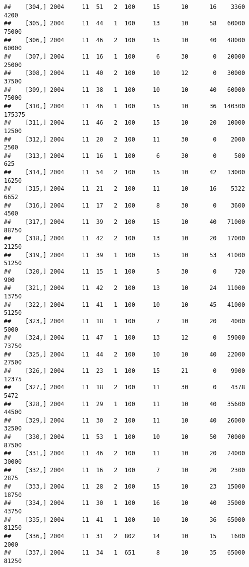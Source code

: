 \documentclass{article}\usepackage[]{graphicx}\usepackage[]{color}
\makeatletter
\newenvironment{kframe}{%
 \def\at@end@of@kframe{}%
 \ifinner\ifhmode%
  \def\at@end@of@kframe{\end{minipage}}%
  \begin{minipage}{\columnwidth}%
 \fi\fi%
 \def\FrameCommand##1{\hskip\@totalleftmargin \hskip-\fboxsep
 \colorbox{shadecolor}{##1}\hskip-\fboxsep
     \hskip-\linewidth \hskip-\@totalleftmargin \hskip\columnwidth}%
 \MakeFramed {\advance\hsize-\width
   \@totalleftmargin\z@ \linewidth\hsize
   \@setminipage}}%
 {\par\unskip\endMakeFramed%
 \at@end@of@kframe}
\newenvironment{knitrout}{}{} %
\makeatother
\begin{document}
\begin{knitrout}
\begin{kframe}
\begin{verbatim}
##    [304,] 2004     11  51   2  100     15      10      16    3360    4200
##    [305,] 2004     11  44   1  100     13      10      58   60000   75000
##    [306,] 2004     11  46   2  100     15      10      40   48000   60000
##    [307,] 2004     11  16   1  100      6      30       0   20000   25000
##    [308,] 2004     11  40   2  100     10      12       0   30000   37500
##    [309,] 2004     11  38   1  100     10      10      40   60000   75000
##    [310,] 2004     11  46   1  100     15      10      36  140300  175375
##    [311,] 2004     11  46   2  100     15      10      20   10000   12500
##    [312,] 2004     11  20   2  100     11      30       0    2000    2500
##    [313,] 2004     11  16   1  100      6      30       0     500     625
##    [314,] 2004     11  54   2  100     15      10      42   13000   16250
##    [315,] 2004     11  21   2  100     11      10      16    5322    6652
##    [316,] 2004     11  17   2  100      8      30       0    3600    4500
##    [317,] 2004     11  39   2  100     15      10      40   71000   88750
##    [318,] 2004     11  42   2  100     13      10      20   17000   21250
##    [319,] 2004     11  39   1  100     15      10      53   41000   51250
##    [320,] 2004     11  15   1  100      5      30       0     720     900
##    [321,] 2004     11  42   2  100     13      10      24   11000   13750
##    [322,] 2004     11  41   1  100     10      10      45   41000   51250
##    [323,] 2004     11  18   1  100      7      10      20    4000    5000
##    [324,] 2004     11  47   1  100     13      12       0   59000   73750
##    [325,] 2004     11  44   2  100     10      10      40   22000   27500
##    [326,] 2004     11  23   1  100     15      21       0    9900   12375
##    [327,] 2004     11  18   2  100     11      30       0    4378    5472
##    [328,] 2004     11  29   1  100     11      10      40   35600   44500
##    [329,] 2004     11  30   2  100     11      10      40   26000   32500
##    [330,] 2004     11  53   1  100     10      10      50   70000   87500
##    [331,] 2004     11  46   2  100     11      10      20   24000   30000
##    [332,] 2004     11  16   2  100      7      10      20    2300    2875
##    [333,] 2004     11  28   2  100     15      10      23   15000   18750
##    [334,] 2004     11  30   1  100     16      10      40   35000   43750
##    [335,] 2004     11  41   1  100     10      10      36   65000   81250
##    [336,] 2004     11  31   2  802     14      10      15    1600    2000
##    [337,] 2004     11  34   1  651      8      10      35   65000   81250

\end{verbatim}
\end{kframe}
\end{knitrout}
\end{document}
